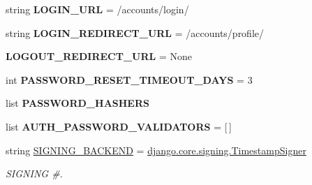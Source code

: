 \begin{DoxyCompactItemize}
\item 
\mbox{\label{namespacedjango_1_1conf_1_1global__settings_a8f53fdf018ddfb52343b3347390fd027}} 
string {\bfseries L\+O\+G\+I\+N\+\_\+\+U\+RL} = \textquotesingle{}/accounts/login/\textquotesingle{}
\item 
\mbox{\label{namespacedjango_1_1conf_1_1global__settings_aaf096277595bf6c2ec29c817e2e5ec6b}} 
string {\bfseries L\+O\+G\+I\+N\+\_\+\+R\+E\+D\+I\+R\+E\+C\+T\+\_\+\+U\+RL} = \textquotesingle{}/accounts/profile/\textquotesingle{}
\item 
\mbox{\label{namespacedjango_1_1conf_1_1global__settings_ae4a5e047d4970b6194de7f04b3d751df}} 
{\bfseries L\+O\+G\+O\+U\+T\+\_\+\+R\+E\+D\+I\+R\+E\+C\+T\+\_\+\+U\+RL} = None
\item 
\mbox{\label{namespacedjango_1_1conf_1_1global__settings_a82f48d69b2982540b1e69c2abaf9cd64}} 
int {\bfseries P\+A\+S\+S\+W\+O\+R\+D\+\_\+\+R\+E\+S\+E\+T\+\_\+\+T\+I\+M\+E\+O\+U\+T\+\_\+\+D\+A\+YS} = 3
\item 
list {\bfseries P\+A\+S\+S\+W\+O\+R\+D\+\_\+\+H\+A\+S\+H\+E\+RS}
\item 
\mbox{\label{namespacedjango_1_1conf_1_1global__settings_a4b138c161744a0da9f02d1de10f2cae8}} 
list {\bfseries A\+U\+T\+H\+\_\+\+P\+A\+S\+S\+W\+O\+R\+D\+\_\+\+V\+A\+L\+I\+D\+A\+T\+O\+RS} = \mbox{[}$\,$\mbox{]}
\item 
\mbox{\label{namespacedjango_1_1conf_1_1global__settings_a1520cc6a6480d1f7c7806cd0ab2e6ced}} 
string \mbox{\hyperlink{namespacedjango_1_1conf_1_1global__settings_a1520cc6a6480d1f7c7806cd0ab2e6ced}{S\+I\+G\+N\+I\+N\+G\+\_\+\+B\+A\+C\+K\+E\+ND}} = \textquotesingle{}\mbox{\hyperlink{classdjango_1_1core_1_1signing_1_1_timestamp_signer}{django.\+core.\+signing.\+Timestamp\+Signer}}\textquotesingle{}
\begin{DoxyCompactList}\small\item\em S\+I\+G\+N\+I\+NG \#. \end{DoxyCompactList}\item 
\mbox{\label{namespacedjango_1_1conf_1_1global__settings_af57fc3caa7d529be0f174d0d01f57e52}} 

\end{DoxyCompactItemize}
